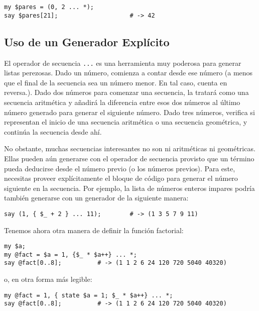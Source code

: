 \begin{verbatim}
my $pares = (0, 2 ... *); 
say $pares[21];                    # -> 42
\end{verbatim} 

\subsection{Uso de un Generador Explícito}

El operador de secuencia \verb|...| es una herramienta muy poderosa
para generar listas perezosas. Dado un número, comienza a contar
desde ese número (a menos que el final de la secuencia sea
un número menor. En tal caso, cuenta en reversa.). Dado dos números
para comenzar una secuencia, la tratará como una secuencia aritmética
y añadirá la diferencia entre esos dos números al último número
generado para generar el siguiente número. Dado tres números,
verifica si representan el inicio de una secuencia aritmética
o una secuencia geométrica, y continúa la secuencia desde ahí.

No obstante, muchas secuencias interesantes no son ni aritméticas
ni geométricas. Ellas pueden aún generarse con el operador de
secuencia provisto que un término pueda deducirse desde el
número previo (o los números previos). Para este, necesitas 
proveer explícitamente el bloque de código para generar el número
siguiente en la secuencia. Por ejemplo, la lista de números 
enteros impares podría también generarse con un generador de
la siguiente manera:

\begin{verbatim}
say (1, { $_ + 2 } ... 11);        # -> (1 3 5 7 9 11)
\end{verbatim}

Tenemos ahora otra manera de definir la función factorial:

\begin{verbatim}
my $a;
my @fact = $a = 1, {$_ * $a++} ... *;
say @fact[0..8];          # -> (1 1 2 6 24 120 720 5040 40320)
\end{verbatim}

o, en otra forma más legible:

\begin{verbatim}
my @fact = 1, { state $a = 1; $_ * $a++} ... *;
say @fact[0..8];          # -> (1 1 2 6 24 120 720 5040 40320)
\end{verbatim}


